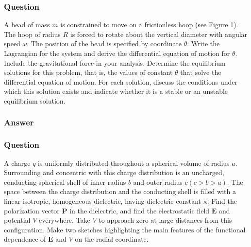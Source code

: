 \subsubsection{Question}
A bead of mass $m$ is constrained to move on a frictionless hoop (see Figure 1). The hoop of radius $R$ is forced to rotate about the vertical diameter with angular speed $\omega.$ The position of the bead is specified by coordinate $\theta$. Write the Lagrangian for the system and derive the differential equation of motion for $\theta$. Include the gravitational force in your analysis. Determine the equilibrium solutions for this problem, that is, the values of constant $\theta$ that solve the differential equation of motion. For each solution, discuss the conditions under which this solution exists and indicate whether it is a stable or an unstable equilibrium solution.
\subsubsection{Answer}


\subsubsection{Question}
A charge $q$ is uniformly distributed throughout a spherical volume of radius $a$. Surrounding and concentric with this charge distribution is an uncharged, conducting spherical shell of inner radius $b$ and outer radius $c (c > b > a)$. The space between the charge distribution and the conducting shell is filled with a linear isotropic, homogeneous dielectric, having dielectric constant ${\kappa}$. Find the polarization vector $\mathbf{P}$ in the dielectric, and find the electrostatic field $\mathbf{E}$ and potential $V$ everywhere. Take $V$ to approach zero at large distances from this configuration. Make two sketches highlighting the main features of the functional dependence of $\mathbf{E}$ and $V$ on the radial coordinate.
